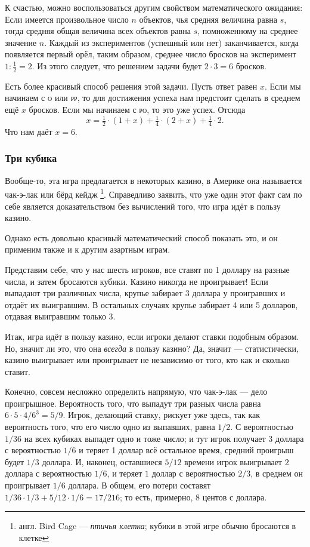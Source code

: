 К счастью, можно воспользоваться другим свойством математического ожидания:
Если имеется произвольное число $n$ объектов, чья средняя величина равна $s$, тогда средняя общая величина всех объектов равна $s$, помноженному на среднее значение $n$.
Каждый из экспериментов (успешный или нет) заканчивается, когда появляется первый орёл, таким образом, среднее число бросков на эксперимент $1:\tfrac12=2$.
Из этого следует, что
решением задачи будет $2{\cdot}3=6$ бросков.\heart

Есть более красивый способ решения этой задачи.
Пусть ответ равен $x$.
Если мы начинаем с \textsc{о} или \textsc{рр}, то для достижения успеха нам предстоит сделать в среднем ещё $x$ бросков.
Если мы начинаем с \textsc{ро}, то это уже успех.
Отсюда
\[x=\tfrac12 \cdot(1+x)+\tfrac14 \cdot(2+x)+\tfrac14 \cdot2.\]
Что нам даёт $x=6$.

\subsubsection*{Три кубика}%

Вообще-то, эта игра предлагается в некоторых казино, в Америке она называется чак-э-лак или бёрд кейдж%
\footnote{англ. Bird Cage --- \emph{птичья клетка}; кубики в этой игре обычно бросаются в клетке}. 
Справедливо заявить, что уже один этот факт сам по себе является доказательством без вычислений того, что игра идёт в пользу казино.

Однако есть довольно красивый математический способ показать это, и он применим также и к другим азартным играм.

\medskip

Представим себе, что у нас шесть игроков, все ставят по 1 доллару на разные числа, и затем бросаются кубики.
Казино никогда не проигрывает!
Если выпадают три различных числа, крупье забирает 3 доллара у проигравших и отдаёт их выигравшим.
В остальных случаях крупье забирает 4 или 5 долларов, отдавая выигравшим только 3.
\heart

Итак, игра идёт в пользу казино, если игроки делают ставки подобным образом.
Но, значит ли это, что она \emph{всегда} в пользу казино?
Да, значит --- статистически, казино выигрывает или проигрывает не независимо от того, кто как и сколько ставит.

Конечно, совсем несложно определить напрямую, что чак-э-лак --- дело проигрышное.
Вероятность того, что выпадут три разных числа равна $6{\cdot}5{\cdot}4/6^3=5/9$.
Игрок, делающий ставку, рискует уже здесь, так как вероятность того, что его число одно из выпавших, равна $1/2$.
С вероятностью $1/36$ на всех кубиках выпадет одно и тоже число;
и тут игрок получает $3$ доллара с вероятностью $1/6$ и теряет 1 доллар всё остальное время, средний проигрыш будет $1/3$ доллара.
И, наконец, оставшиеся $5/12$ времени игрок выигрывает $2$ доллара с вероятностью $1/6$, и теряет $1$ доллар с вероятностью $2/3$, в среднем он проигрывает $1/6$ доллара.
В общем, его потери составят $1/36{\cdot}1/3 + 5/12{\cdot}1/6 = 17/216$; то есть, примерно, $8$ центов с доллара.

